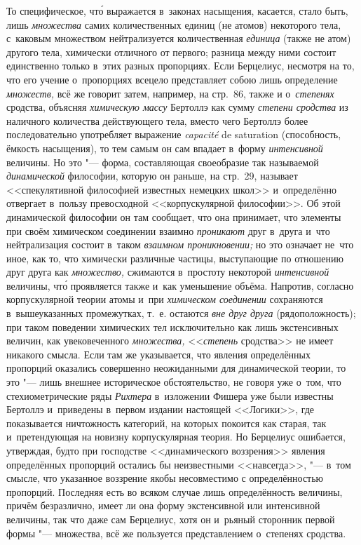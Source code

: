 То специфическое, чт\'{о} выражается в~законах насыщения, касается, стало быть,
лишь {\em множества} самих количественных единиц (не атомов) некоторого тела,
с~каковым множеством нейтрализуется количественная {\em единица} (также не
атом) другого тела, химически отличного от первого; разница между ними состоит
единственно только в~этих разных пропорциях. Если Берцелиус, несмотря на то,
что его учение о~пропорциях всецело представляет собою лишь определение
{\em множеств,} всё же говорит затем, например, на стр.~86, также и
о~{\em степенях} сродства, объясняя {\em химическую массу} Бертоллэ как сумму
{\em степени сродства} из наличного количества действующего тела, вместо чего
Бертоллэ более последовательно употребляет выражение {\em capa\-cité} de
satura\-tion (способность, ёмкость насыщения), то тем самым он сам впадает
в~форму {\em интенсивной} величины. Но это "--- форма, составляющая своеобразие
так называемой {\em динамической} философии, которую он раньше, на стр.~29,
называет <<спекулятивной философией известных немецких школ>> и~определённо
отвергает в~пользу превосходной <<корпускулярной философии>>. Об этой
динамической философии он там сообщает, что она принимает, что элементы при
своём химическом соединении взаимно {\em проникают} друг в~друга и~что
нейтрализация состоит в~таком {\em взаимном проникновении;} но это означает
не~что иное, как то, что химически различные частицы, выступающие по отношению
друг друга как {\em множество,} сжимаются в~простоту некоторой
{\em интенсивной} величины, чт\'{о} проявляется также и~как уменьшение объёма.
Напротив, согласно корпускулярной теории атомы и~при
{\em химическом соединении} сохраняются в~вышеуказанных промежутках, т.~е.
остаются {\em вне друг друга} (рядоположность); при таком поведении химических
тел исключительно как лишь экстенсивных величин, как увековеченного
{\em множества,} <<{\em степень} сродства>> не имеет никакого смысла. Если там
же указывается, что явления определённых пропорций оказались совершенно
неожиданными для динамической теории, то это "--- лишь внешнее историческое
обстоятельство, не говоря уже о~том, что стехиометрические ряды {\em Рихтера}
в~изложении Фишера уже были известны Бертоллэ и~приведены в~первом издании
настоящей <<Логики>>, где показывается ничтожность категорий, на которых
покоится как старая, так и~претендующая на новизну корпускулярная теория.
Но Берцелиус ошибается, утверждая, будто при господстве <<динамического
воззрения>> явления определённых пропорций остались бы неизвестными
<<навсегда>>, "--- в~том смысле, что указанное воззрение якобы несовместимо с
определённостью пропорций. Последняя есть во всяком случае лишь определённость
величины, причём безразлично, имеет ли она форму экстенсивной или интенсивной
величины, так что даже сам Берцелиус, хотя он и~рьяный сторонник первой формы
"--- множества, всё же пользуется представлением о~степенях сродства.

